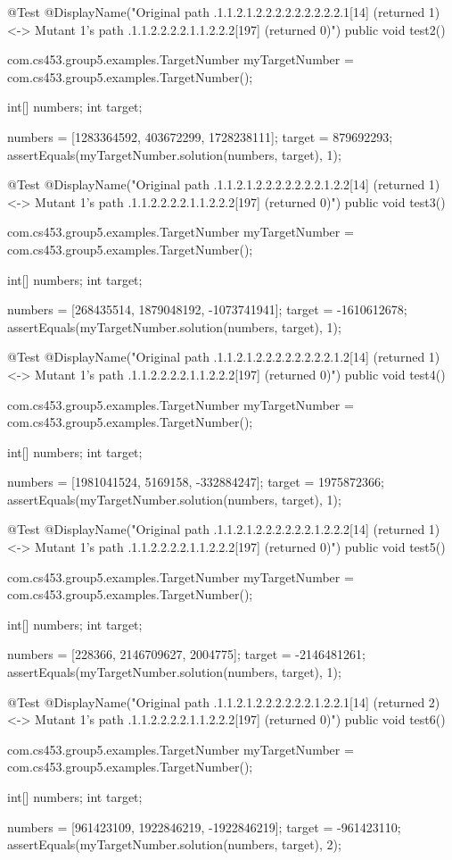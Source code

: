 @Test
@DisplayName("Original path .1.1.2.1.2.2.2.2.2.2.2.2.2.1[14] (returned 1) <-> Mutant 1's path .1.1.2.2.2.2.1.1.2.2.2[197] (returned 0)")
public void test2() {
    com.cs453.group5.examples.TargetNumber myTargetNumber = com.cs453.group5.examples.TargetNumber();

    int[] numbers;
    int target;

    numbers = [1283364592, 403672299, 1728238111];
    target = 879692293;
    assertEquals(myTargetNumber.solution(numbers, target), 1);
}

@Test
@DisplayName("Original path .1.1.2.1.2.2.2.2.2.2.2.1.2.2[14] (returned 1) <-> Mutant 1's path .1.1.2.2.2.2.1.1.2.2.2[197] (returned 0)")
public void test3() {
    com.cs453.group5.examples.TargetNumber myTargetNumber = com.cs453.group5.examples.TargetNumber();

    int[] numbers;
    int target;

    numbers = [268435514, 1879048192, -1073741941];
    target = -1610612678;
    assertEquals(myTargetNumber.solution(numbers, target), 1);
}

@Test
@DisplayName("Original path .1.1.2.1.2.2.2.2.2.2.2.2.1.2[14] (returned 1) <-> Mutant 1's path .1.1.2.2.2.2.1.1.2.2.2[197] (returned 0)")
public void test4() {
    com.cs453.group5.examples.TargetNumber myTargetNumber = com.cs453.group5.examples.TargetNumber();

    int[] numbers;
    int target;

    numbers = [1981041524, 5169158, -332884247];
    target = 1975872366;
    assertEquals(myTargetNumber.solution(numbers, target), 1);
}

@Test
@DisplayName("Original path .1.1.2.1.2.2.2.2.2.2.1.2.2.2[14] (returned 1) <-> Mutant 1's path .1.1.2.2.2.2.1.1.2.2.2[197] (returned 0)")
public void test5() {
    com.cs453.group5.examples.TargetNumber myTargetNumber = com.cs453.group5.examples.TargetNumber();

    int[] numbers;
    int target;

    numbers = [228366, 2146709627, 2004775];
    target = -2146481261;
    assertEquals(myTargetNumber.solution(numbers, target), 1);
}

@Test
@DisplayName("Original path .1.1.2.1.2.2.2.2.2.2.1.2.2.1[14] (returned 2) <-> Mutant 1's path .1.1.2.2.2.2.1.1.2.2.2[197] (returned 0)")
public void test6() {
    com.cs453.group5.examples.TargetNumber myTargetNumber = com.cs453.group5.examples.TargetNumber();

    int[] numbers;
    int target;

    numbers = [961423109, 1922846219, -1922846219];
    target = -961423110;
    assertEquals(myTargetNumber.solution(numbers, target), 2);
}

